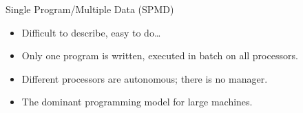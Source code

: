 \begin{frame}
  \begin{block}{Single Program/Multiple Data (SPMD)}\pause
    \begin{itemize}
      \item Difficult to describe, easy to do\dots
      \item Only one program is written, executed in batch on all processors.
      \item Different processors are autonomous; there is no manager.
      \item The dominant programming model for large machines.
    \end{itemize}
  \end{block}
\end{frame}
